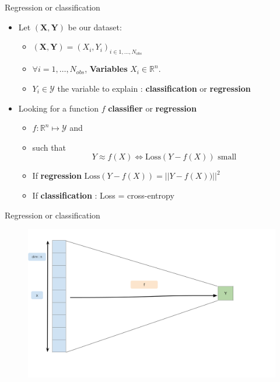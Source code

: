 \documentclass[compress,10pt]{beamer}
\begin{document}
\begin{frame}{Regression or classification}
\begin{itemize}

\item
  Let \((\mathbf{X},\mathbf{Y})\) be our dataset:

  \begin{itemize}
  \item
  \((\mathbf{X},\mathbf{Y})=(X_i, Y_i)_{i \in 1, \dots,N_{obs}}\)
\item
  \(\forall i =1,\dots,N_{obs}\), \textbf{Variables}
  \(X_i \in \mathbb{R}^n\).\\
\item
  \(Y_i \in \mathcal{Y}\) the variable to explain :
  \textbf{classification} or \textbf{regression}
\end{itemize}
\item  Looking for a function \(f\)  \textbf{classifier} or \textbf{regression}

\begin{itemize}
 \item
 
  \(f :\mathbb{R}^n \mapsto \mathcal{Y}\) and
\item
  such that
  \[Y \approx f(X) \Leftrightarrow \mbox{Loss}(Y -   f(X)) \mbox{ small } \]
\item
  If \textbf{regression} \(\mbox{Loss}(Y - f(X)) = ||Y - f(X)) ||^2\)
\item
  If \textbf{classification} : Loss = cross-entropy
\end{itemize}
\end{itemize}
\end{frame}

\begin{frame}{Regression or classification}
\begin{figure}

{\centering \includegraphics[width=0.9\linewidth]{images/RegressionClassification} 

}


\end{figure}
\end{frame}
\end{document}
